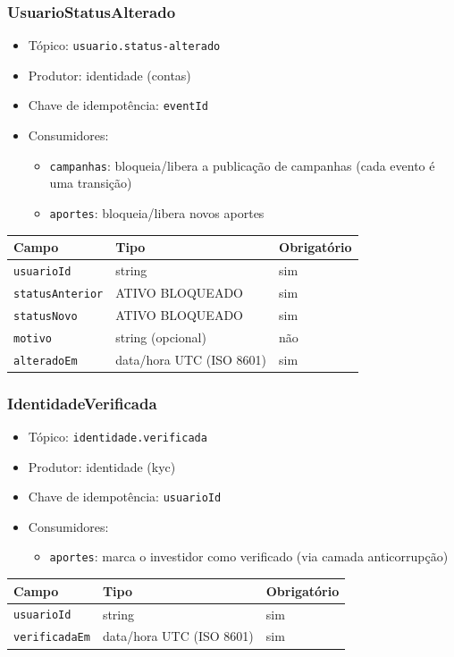\subsubsection{UsuarioStatusAlterado}
\begin{itemize}
  \item Tópico: \texttt{usuario.status-alterado}
  \item Produtor: identidade (contas)
  \item Chave de idempotência: \texttt{eventId}
  \item Consumidores:
  \begin{itemize}
    \item \texttt{campanhas}: bloqueia/libera a publicação de campanhas (cada evento é uma transição)
    \item \texttt{aportes}: bloqueia/libera novos aportes
  \end{itemize}
\end{itemize}
\begin{tabular}{lll}
\hline
Campo & Tipo & Obrigatório \\
\hline
\texttt{usuarioId} & string & sim \\
\texttt{statusAnterior} & ATIVO \textbar{} BLOQUEADO & sim \\
\texttt{statusNovo} & ATIVO \textbar{} BLOQUEADO & sim \\
\texttt{motivo} & string (opcional) & não \\
\texttt{alteradoEm} & data/hora UTC (ISO 8601) & sim \\
\hline
\end{tabular}

\subsubsection{IdentidadeVerificada}
\begin{itemize}
  \item Tópico: \texttt{identidade.verificada}
  \item Produtor: identidade (kyc)
  \item Chave de idempotência: \texttt{usuarioId}
  \item Consumidores:
  \begin{itemize}
    \item \texttt{aportes}: marca o investidor como verificado (via camada anticorrupção)
  \end{itemize}
\end{itemize}
\begin{tabular}{lll}
\hline
Campo & Tipo & Obrigatório \\
\hline
\texttt{usuarioId} & string & sim \\
\texttt{verificadaEm} & data/hora UTC (ISO 8601) & sim \\
\hline
\end{tabular}

